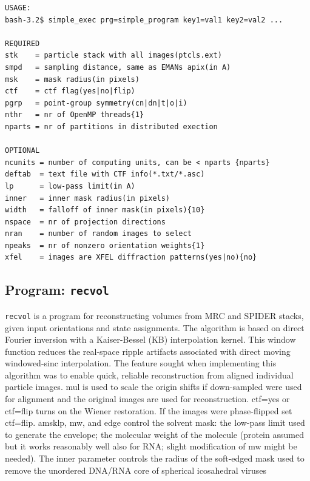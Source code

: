 \documentclass[a4paper,11pt]{article}
\newcommand{\prgname}[1]{\textcolor{NavyBlue}{\texttt{#1}}}
\begin{document}
\begin{verbatim}
USAGE:
bash-3.2$ simple_exec prg=simple_program key1=val1 key2=val2 ...

REQUIRED
stk    = particle stack with all images(ptcls.ext)
smpd   = sampling distance, same as EMANs apix(in A)
msk    = mask radius(in pixels)
ctf    = ctf flag(yes|no|flip)
pgrp   = point-group symmetry(cn|dn|t|o|i)
nthr   = nr of OpenMP threads{1}
nparts = nr of partitions in distributed exection

OPTIONAL
ncunits = number of computing units, can be < nparts {nparts}
deftab  = text file with CTF info(*.txt/*.asc)
lp      = low-pass limit(in A)
inner   = inner mask radius(in pixels)
width   = falloff of inner mask(in pixels){10}
nspace  = nr of projection directions
nran    = number of random images to select
npeaks  = nr of nonzero orientation weights{1}
xfel    = images are XFEL diffraction patterns(yes|no){no}
\end{verbatim}

\subsection{Program: \prgname{recvol}}
\label{recvol}
\prgname{recvol} is a program for reconstructing volumes from MRC and SPIDER stacks, given input orientations and state assignments. The algorithm is based on direct Fourier inversion with a Kaiser-Bessel (KB) interpolation kernel. This window function reduces the real-space ripple artifacts associated with direct moving windowed-sinc interpolation. The feature sought when implementing this algorithm was to enable quick, reliable reconstruction from aligned individual particle images. mul is used to scale the origin shifts if down-sampled were used for alignment and the original images are used for reconstruction. ctf=yes or ctf=flip turns on the Wiener restoration. If the images were phase-flipped set ctf=flip. amsklp, mw, and edge control the solvent mask: the low-pass limit used to generate the envelope; the molecular weight of the molecule (protein assumed but it works reasonably well also for RNA; slight modification of mw might be needed). The inner parameter controls the radius of the soft-edged mask used to remove the unordered DNA/RNA core of spherical icosahedral viruses
\end{document}
